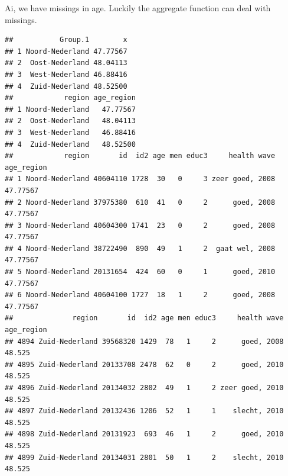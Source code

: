 \documentclass[
]{book}
\newenvironment{Shaded}{\begin{snugshade}}{\end{snugshade}}
\newcommand{\CommentTok}[1]{\textcolor[rgb]{0.56,0.35,0.01}{\textit{#1}}}
\newcommand{\DataTypeTok}[1]{\textcolor[rgb]{0.13,0.29,0.53}{#1}}
\newcommand{\KeywordTok}[1]{\textcolor[rgb]{0.13,0.29,0.53}{\textbf{#1}}}
\newcommand{\NormalTok}[1]{#1}
\newcommand{\OperatorTok}[1]{\textcolor[rgb]{0.81,0.36,0.00}{\textbf{#1}}}
\newcommand{\OtherTok}[1]{\textcolor[rgb]{0.56,0.35,0.01}{#1}}
\newcommand{\StringTok}[1]{\textcolor[rgb]{0.31,0.60,0.02}{#1}}
\begin{document}
Ai, we have missings in age. Luckily the aggregate function can deal with missings.

\begin{Shaded}
\end{Shaded}

\begin{verbatim}
##           Group.1        x
## 1 Noord-Nederland 47.77567
## 2  Oost-Nederland 48.04113
## 3  West-Nederland 46.88416
## 4  Zuid-Nederland 48.52500
##            region age_region
## 1 Noord-Nederland   47.77567
## 2  Oost-Nederland   48.04113
## 3  West-Nederland   46.88416
## 4  Zuid-Nederland   48.52500
##            region       id  id2 age men educ3     health wave age_region
## 1 Noord-Nederland 40604110 1728  30   0     3 zeer goed, 2008   47.77567
## 2 Noord-Nederland 37975380  610  41   0     2      goed, 2008   47.77567
## 3 Noord-Nederland 40604300 1741  23   0     2      goed, 2008   47.77567
## 4 Noord-Nederland 38722490  890  49   1     2  gaat wel, 2008   47.77567
## 5 Noord-Nederland 20131654  424  60   0     1      goed, 2010   47.77567
## 6 Noord-Nederland 40604100 1727  18   1     2      goed, 2008   47.77567
##              region       id  id2 age men educ3     health wave age_region
## 4894 Zuid-Nederland 39568320 1429  78   1     2      goed, 2008     48.525
## 4895 Zuid-Nederland 20133708 2478  62   0     2      goed, 2010     48.525
## 4896 Zuid-Nederland 20134032 2802  49   1     2 zeer goed, 2010     48.525
## 4897 Zuid-Nederland 20132436 1206  52   1     1    slecht, 2010     48.525
## 4898 Zuid-Nederland 20131923  693  46   1     2      goed, 2010     48.525
## 4899 Zuid-Nederland 20134031 2801  50   1     2    slecht, 2010     48.525
\end{verbatim}
\end{document}
